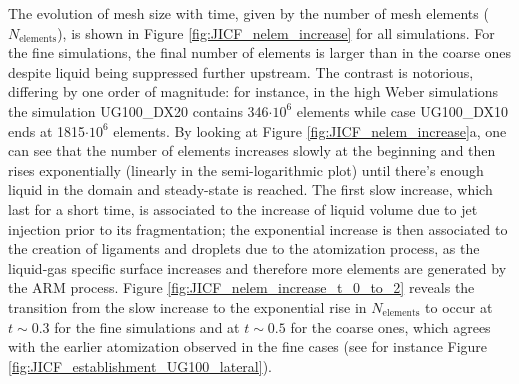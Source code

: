 The evolution of mesh size with time, given by the number of mesh elements ($N_\mathrm{elements}$), is shown in Figure \ref{fig:JICF_nelem_increase} for all simulations. For the fine simulations, the final number of elements is larger than in the coarse ones despite liquid being suppressed further upstream. The contrast is notorious, differing by one order of magnitude: for instance, in the high Weber simulations the simulation UG100\_DX20 contains 346$\cdot 10^6$ elements while case UG100\_DX10 ends at 1815$\cdot 10^6$ elements. By looking at Figure \ref{fig:JICF_nelem_increase}a, one can see that the number of elements increases slowly at the beginning and then rises exponentially (linearly in the semi-logarithmic plot) until there’s enough liquid in the domain and steady-state is reached. The first slow increase, which last for a short time, is associated to the increase of liquid volume due to jet injection prior to its fragmentation; the exponential increase is then associated to the creation of ligaments and droplets due to the atomization process, as the liquid-gas specific surface increases and therefore more elements are generated by the ARM process. Figure \ref{fig:JICF_nelem_increase_t_0_to_2} reveals the transition from the slow increase to the exponential rise in $N_\mathrm{elements}$ to occur at $t \sim 0.3$ for the fine simulations and at $t \sim 0.5$ for the coarse ones, which agrees with the earlier atomization observed in the fine cases (see for instance Figure \ref{fig:JICF_establishment_UG100_lateral}).



